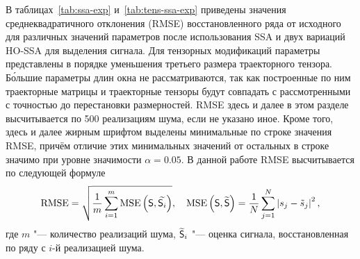 \documentclass[specialist,
  substylefile=spbu.rtx,
subf,href,colorlinks=true, 12pt]{disser}
\theoremstyle{plain}
\theoremstyle{definition}
\theoremstyle{remark}
\begin{document}
В таблицах~\ref{tab:ssa-exp} и~\ref{tab:tens-ssa-exp} приведены значения среднеквадратичного отклонения
(RMSE) восстановленного ряда от исходного
для различных значений параметров после использования SSA и двух вариаций HO-SSA для выделения сигнала.
Для тензорных модификаций параметры представлены в порядке уменьшения третьего размера траекторного тензора.
Б\'{о}льшие параметры длин окна не рассматриваются, так как построенные по ним траекторные матрицы и траекторные
тензоры будут совпадать с рассмотренными с точностью до перестановки размерностей.
RMSE здесь и далее в этом разделе высчитывается по 500 реализациям шума, если не указано иное.
Кроме того, здесь и далее жирным шрифтом выделены минимальные по строке значения RMSE, причём
отличие этих минимальных значений от остальных в строке значимо при уровне значимости $\alpha = 0.05$.
В данной работе RMSE высчитывается по следующей формуле
\begin{equation*}
  \text{RMSE} = \sqrt{\frac{1}{m} \sum_{i=1}^{m} \text{MSE}\left(\mathsf{S}, \widetilde{\mathsf{S}_i}\right)},
  \quad \text{MSE}\left(\mathsf{S}, \widetilde{\mathsf{S}} \right) = \frac{1}{N} \sum_{j=1}^{N}\left|s_j - \tilde{s}_j\right|^2,
\end{equation*}
где $m$ "--- количество реализаций шума, $\widetilde{\mathsf{S}}_i$ "--- оценка сигнала,
восстановленная по ряду с $i$-й реализацией шума.
\end{document}
